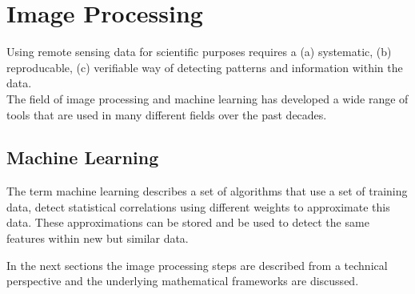 \documentclass[a4paper, english]{article}
\begin{document}
    \section{Image Processing}\label{sec:imgProcessing}
    Using remote sensing data for scientific purposes requires a (a) systematic, (b) reproducable, (c) verifiable way of detecting patterns and information within the data. \\ 
    The field of image processing and machine learning has developed a wide range of tools that are used in many different fields over the past decades. %
    \subsection{Machine Learning}\label{sec:ml}
    The term machine learning describes a set of algorithms that use a set of training data, detect statistical correlations using different weights to approximate this data. %
    These approximations can be stored and be used to detect the same features within new but similar data.
    
    In the next sections the image processing steps are described from a technical perspective and the underlying mathematical frameworks are discussed.
\end{document}
